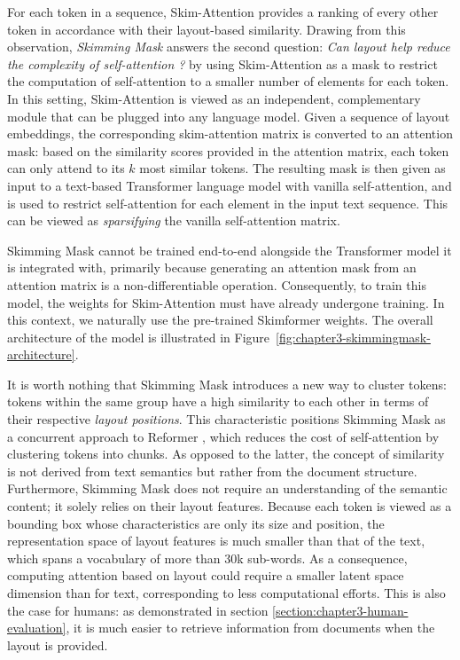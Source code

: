 For each token in a sequence, Skim-Attention provides a ranking of every other token in accordance with their layout-based similarity. Drawing from this observation, \emph{Skimming Mask} answers the second question: \textit{Can layout help reduce the complexity of self-attention ?} by using Skim-Attention as a mask to restrict the computation of self-attention to a smaller number of elements for each token. In this setting, Skim-Attention is viewed as an independent, complementary module that can be plugged into any language model. Given a sequence of layout embeddings, the corresponding skim-attention matrix is converted to an attention mask: based on the similarity scores provided in the attention matrix, each token can only attend to its $k$ most similar tokens. The resulting mask is then given as input to a text-based Transformer language model with vanilla self-attention, and is used to restrict self-attention for each element in the input text sequence. This can be viewed as \emph{sparsifying} the vanilla self-attention matrix.

Skimming Mask cannot be trained end-to-end alongside the Transformer model it is integrated with, primarily because generating an attention mask from an attention matrix is a non-differentiable operation. Consequently, to train this model, the weights for Skim-Attention must have already undergone training. In this context, we naturally use the pre-trained Skimformer weights.  The overall architecture of the model is illustrated in Figure~\ref{fig:chapter3-skimmingmask-architecture}.

It is worth nothing that Skimming Mask introduces a new way to cluster tokens: tokens within the same group have a high similarity to each other in terms of their respective \emph{layout positions}. This characteristic positions Skimming Mask as a concurrent approach to Reformer \citep{kitaev2020reformer}, which reduces the cost of self-attention by clustering tokens into chunks. As opposed to the latter, the concept of similarity is not derived from text semantics but rather from the document structure. Furthermore, Skimming Mask does not require an understanding of the semantic content; it solely relies on their layout features. Because each token is viewed as a bounding box whose characteristics are only its size and position, the representation space of layout features is much smaller than that of the text, which spans a vocabulary of more than 30k sub-words. As a consequence, computing attention based on layout could require a smaller latent space dimension than for text, corresponding to less computational efforts. This is also the case for humans: as demonstrated in section \ref{section:chapter3-human-evaluation}, it is much easier to retrieve information from documents when the layout is provided.


